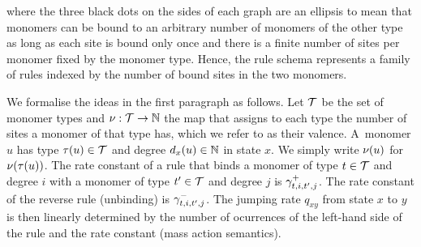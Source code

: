 \begin{center}
\end{center}
where the three black dots on the sides of each graph
are an ellipsis to mean that monomers can be bound
to an arbitrary number of monomers of the other type
as long as each site is bound only once
and there is a finite number of sites per monomer
fixed by the monomer type.
Hence, the rule schema %
represents a family of rules indexed by %
the number of bound sites in the two monomers.

We formalise the ideas in the first paragraph as follows.
Let $\mathcal{T}$ be the set of monomer types %
and $\nu: \mathcal{T} \to \mathbb{N}$ the map that assigns
to each type the number of sites a monomer of that type has,
which we refer to as their valence.
A~monomer $u$ has type $\tau(u) \in \mathcal{T}$
and degree $d_x(u) \in \mathbb{N}$ in state $x$.
We simply write $\nu(u)$ for $\nu(\tau(u))$.
The rate constant of a rule that binds
a monomer of type $t \in \mathcal{T}$ and degree $i$ with
a monomer of type $t' \in \mathcal{T}$ and degree $j$
is $\gamma^+_{t,i,t',j}$.
The rate constant of the reverse rule (unbinding)
is $\gamma^-_{t,i,t',j}$.
%
The jumping rate $q_{xy}$ from state $x$ to $y$
is then linearly determined by the number of ocurrences
of the left-hand side of the rule and the rate constant
(mass action semantics).

